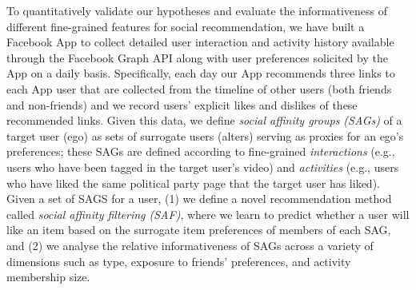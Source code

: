 To quantitatively validate our hypotheses and evaluate the
informativeness of different fine-grained features for social
recommendation, we have built a Facebook App to collect detailed user
interaction and activity history available through the Facebook Graph
API along with user preferences solicited by the App on a daily basis.
Specifically, each day our App recommends three links to each App user
that are collected from the timeline of other users (both friends and
non-friends) and we record users' explicit likes and dislikes of these
recommended links.  Given this data, we define \emph{social affinity
groups (SAGs)} of a target user (ego) as sets of surrogate users
(alters) serving as proxies for an ego's preferences; these SAGs are
defined according to fine-grained
\emph{interactions} (e.g., users who have been tagged in the target user's
video) and \emph{activities} (e.g., users who have liked the same
political party page that the target user has liked).  Given a set of
SAGS for a user, (1) we define a novel recommendation method called
{\em social affinity filtering (SAF)}, where we learn to predict
whether a user will like an item based on the surrogate item
preferences of members of each SAG, and (2) we analyse the relative
informativeness of SAGs across a variety of dimensions such as type,
exposure to friends' preferences, and activity membership size.

